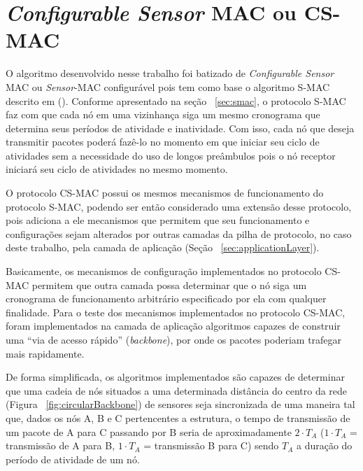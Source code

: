 \section{\emph{Configurable Sensor} MAC ou CS-MAC}

O algoritmo desenvolvido nesse trabalho foi batizado de \emph{Configurable Sensor} MAC ou \emph{Sensor}-MAC configurável pois tem como base o algoritmo S-MAC descrito em  (\citeyear{ye04}). Conforme apresentado na seção ~\ref{sec:smac}, o protocolo S-MAC faz com que cada nó em uma vizinhança siga um mesmo cronograma que determina seus períodos de atividade e inatividade. Com isso, cada nó que deseja transmitir pacotes poderá fazê-lo no momento em que iniciar seu ciclo de atividades sem a necessidade do uso de longos preâmbulos pois o nó receptor iniciará seu ciclo de atividades no mesmo momento.

O protocolo CS-MAC possui os mesmos mecanismos de funcionamento do protocolo S-MAC, podendo ser então considerado uma extensão desse protocolo, pois adiciona a ele mecanismos que permitem que seu funcionamento e configurações sejam alterados por outras camadas da pilha de protocolo, no caso deste trabalho, pela camada de aplicação (Seção ~\ref{sec:applicationLayer}). 

Basicamente, os mecanismos de configuração implementados no protocolo CS-MAC permitem que outra camada possa determinar que o nó siga um cronograma de funcionamento arbitrário especificado por ela com qualquer finalidade. Para o teste dos mecanismos implementados no protocolo CS-MAC, foram implementados na camada de aplicação algoritmos capazes de construir uma ``via de acesso rápido'' (\emph{backbone}), por onde os pacotes poderiam trafegar mais rapidamente.

De forma simplificada, os algoritmos implementados são capazes de determinar que uma cadeia de nós situados a uma determinada distância do centro da rede (Figura ~\ref{fig:circularBackbone}) de sensores seja sincronizada de uma maneira tal que, dados os nós A, B e C pertencentes a estrutura, o tempo de transmissão de um pacote de A para C passando por B seria de aproximadamente $2 \cdot T_A$  ($1 \cdot T_A$ = transmissão de A para B, $1 \cdot T_A$ = transmissão B para C) sendo $T_A$ a duração do período de atividade de um nó. 

